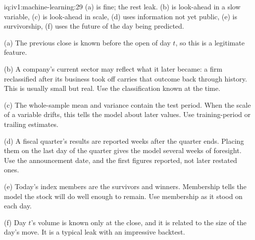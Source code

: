 \begin{solution}{iq:iv1:machine-learning:29}
(a) is fine; the rest leak. (b) is look-ahead in a slow variable, (c) is look-ahead in scale, (d) uses information not yet public, (e) is survivorship, (f) uses the future of the day being predicted.

(a) The previous close is known before the open of day $t$, so this is a legitimate feature.

(b) A company's current sector may reflect what it later became: a firm reclassified after its business took off carries that outcome back through history. This is usually small but real. Use the classification known at the time.

(c) The whole-sample mean and variance contain the test period. When the scale of a variable drifts, this tells the model about later values. Use training-period or trailing estimates.

(d) A fiscal quarter's results are reported weeks after the quarter ends. Placing them on the last day of the quarter gives the model several weeks of foresight. Use the announcement date, and the first figures reported, not later restated ones.

(e) Today's index members are the survivors and winners. Membership tells the model the stock will do well enough to remain. Use membership as it stood on each day.

(f) Day $t$'s volume is known only at the close, and it is related to the size of the day's move. It is a typical leak with an impressive backtest.



\end{solution}

